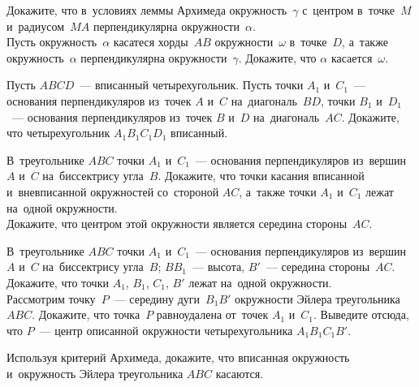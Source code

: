 \begin{problems}

\item
\subproblem
Докажите, что в~условиях леммы Архимеда окружность~$\gamma$ с~центром
в~точке~$M$ и~радиусом~$MA$ перпендикулярна окружности~$\alpha$.
\\
\subproblem{}
Пусть окружность~$\alpha$ касатеся хорды~$AB$ окружности~$\omega$ в~точке~$D$,
а~также окружность~$\alpha$ перпендикулярна окружности~$\gamma$.
Докажите, что $\alpha$ касается~$\omega$.

\item
Пусть $ABCD$~--- вписанный четырехугольник.
Пусть точки $A_1$ и~$C_1$~--- основания перпендикуляров из~точек $A$ и~$C$
на~диагональ~$BD$, точки $B_1$ и~$D_1$~--- основания перпендикуляров из~точек
$B$ и~$D$ на~диагональ~$AC$.
Докажите, что четырехугольник $A_1 B_1 C_1 D_1$ вписанный.

\item
\subproblem
В~треугольнике $ABC$ точки $A_1$ и~$C_1$~--- основания
перпендикуляров из~вершин $A$ и~$C$ на~биссектрису угла~$B$.
Докажите, что точки касания вписанной и~вневписанной окружностей со~стороной
$AC$, а~также точки $A_1$ и~$C_1$ лежат на~одной окружности.
\\
\subproblem
Докажите, что центром этой окружности является середина стороны~$AC$.

\item
\subproblem
В~треугольнике $ABC$ точки $A_1$ и~$C_1$~--- основания перпендикуляров
из~вершин $A$ и~$C$ на~биссектрису угла~$B$;
$B B_1$~--- высота, $B'$~--- середина стороны~$AC$.
Докажите, что точки $A_1$, $B_1$, $C_1$, $B'$ лежат на~одной окружности.
\\
\subproblem
Рассмотрим точку~$P$~--- середину дуги~$B_1 B'$ окружности Эйлера
треугольника $ABC$.
Докажите, что точка~$P$ равноудалена от~точек $A_1$ и~$C_1$.
Выведите отсюда, что $P$~--- центр описанной окружности
четырехугольника $A_1 B_1 C_1 B'$.

\item{}
Используя критерий Архимеда, докажите, что вписанная окружность и~окружность
Эйлера треугольника $ABC$ касаются.

\end{problems}

